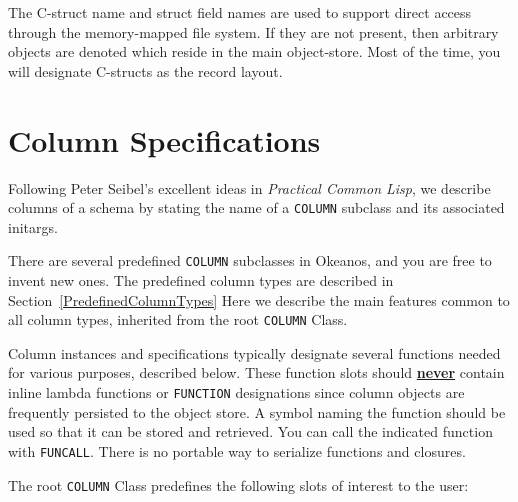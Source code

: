 \documentclass[article,oneside]{memoir}
\begin{document}
The C-struct name and struct field names are used to support direct access through the memory-mapped file system. If they are not present, then arbitrary objects are denoted which reside in the main object-store. Most of the time, you will designate C-structs as the record layout.

\section{Column Specifications}
Following Peter Seibel's excellent ideas in \textit{Practical Common Lisp}, we describe columns of a schema by stating the name of a \texttt{COLUMN} subclass and its associated initargs.

There are several predefined \texttt{COLUMN} subclasses in Okeanos, and you are free to invent new ones. The predefined column types are described in Section~\ref{PredefinedColumnTypes} Here we describe the main features common to all column types, inherited from the root \texttt{COLUMN} Class.

Column instances and specifications typically designate several functions needed for various purposes, described below. These function slots should \underline{\textbf{never}} contain inline lambda functions or \texttt{FUNCTION} designations since column objects are frequently persisted to the object store. A symbol naming the function should be used so that it can be stored and retrieved. You can call the indicated function with \texttt{FUNCALL}. There is no portable way to serialize functions and closures.

The root \texttt{COLUMN} Class predefines the following slots of interest to the user:
\end{document}
